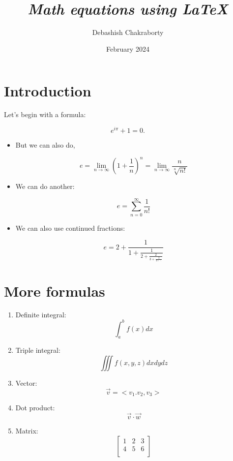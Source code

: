 \documentclass{article}
\title{\textit{\Huge Math equations using \LaTeX}}
\author{Debashish Chakraborty}
\date{February 2024}
\begin{document}
\maketitle

\section*{Introduction}
Let's begin with a formula:

$$\textit{$e^{i\pi}+1=0$.}$$

\begin{itemize}
\item But we can also do,

$$e= \lim_{n\to\infty} \left(1+\frac{1}{n}\right)^n = \lim_{n\to\infty} \frac{n}{\sqrt[n]{n!}} $$

\item We can do another:

$$e = \sum_{n=0}^\infty \frac{1}{n!}$$

\item We can also use continued fractions:

$$e = 2+\frac{1}{1+\frac{1}{2+\frac{2}{3+\frac{3}{4+\ddots}}}}$$
\end{itemize}

\section*{More formulas}
\begin{enumerate}
\item Definite integral:
$$\int_a^bf(x)dx$$
\item Triple integral: 
$$\iiint f(x,y,z)dxdydz$$
\item Vector:
$$\vec{v} = <v_1.v_2,v_3>$$
\item Dot product:
$$\vec{v}\cdot\vec{w}$$

\item Matrix:
$$
\begin{bmatrix}
1 & 2 & 3\\
4 & 5 & 6\\
\end{bmatrix}
$$
\end{enumerate}

\end{document}
